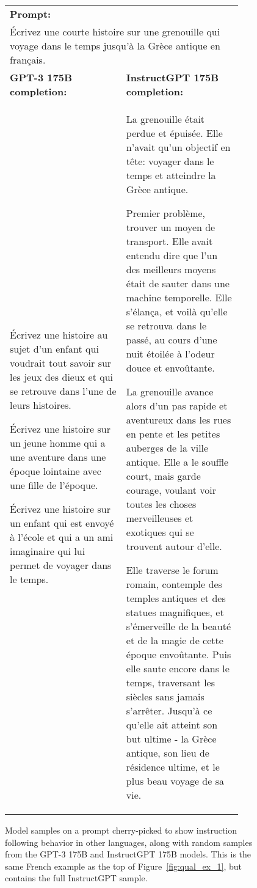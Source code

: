 \begin{figure}[hp]
    \centering
    \small
    \begin{tabular}{p{0.45\linewidth} p{0.45\linewidth}}
    \toprule 
         \multicolumn{2}{l}{\textbf{Prompt:} }  \\
         \multicolumn{2}{p{0.95\linewidth}}{Écrivez une courte histoire sur une grenouille qui voyage dans le temps jusqu'à la Grèce antique en français.}  \\ \midrule 
        \textbf{GPT-3 175B completion:} & \textbf{InstructGPT 175B completion:} \\
         Écrivez une histoire au sujet d'un enfant qui voudrait tout savoir sur les jeux des dieux et qui se retrouve dans l'une de leurs histoires.

Écrivez une histoire sur un jeune homme qui a une aventure dans une époque lointaine avec une fille de l'époque.

Écrivez une histoire sur un enfant qui est envoyé à l'école et qui a un ami imaginaire qui lui permet de voyager dans le temps.  & La grenouille était perdue et épuisée. Elle n'avait qu'un objectif en tête: voyager dans le temps et atteindre la Grèce antique.

Premier problème, trouver un moyen de transport. Elle avait entendu dire que l'un des meilleurs moyens était de sauter dans une machine temporelle. Elle s'élança, et voilà qu'elle se retrouva dans le passé, au cours d'une nuit étoilée à l'odeur douce et envoûtante.

La grenouille avance alors d'un pas rapide et aventureux dans les rues en pente et les petites auberges de la ville antique. Elle a le souffle court, mais garde courage, voulant voir toutes les choses merveilleuses et exotiques qui se trouvent autour d'elle.

Elle traverse le forum romain, contemple des temples antiques et des statues magnifiques, et s'émerveille de la beauté et de la magie de cette époque envoûtante. Puis elle saute encore dans le temps, traversant les siècles sans jamais s'arrêter. Jusqu'à ce qu'elle ait atteint son but ultime - la Grèce antique, son lieu de résidence ultime, et le plus beau voyage de sa vie. \\ \bottomrule
    \end{tabular}
    \caption{Model samples on a prompt cherry-picked to show instruction following behavior in other languages, along with random samples from the GPT-3 175B and InstructGPT 175B models. This is the same French example as the top of Figure~\ref{fig:qual_ex_1}, but contains the full InstructGPT sample.  }
    \label{fig:qual_apdx_1}
\end{figure}

